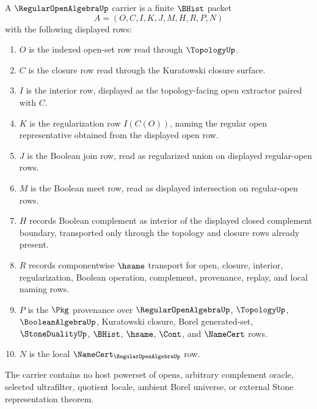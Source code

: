 \begin{definition}
\label{def:regular-open-algebra-carrier}
A $\RegularOpenAlgebraUp$ carrier is a finite $\BHist$ packet
$$
A=(O,C,I,K,J,M,H,R,P,N)
$$
with the following displayed rows:
\begin{enumerate}
\item $O$ is the indexed open-set row read through $\TopologyUp$.
\item $C$ is the closure row read through the Kuratowski closure surface.
\item $I$ is the interior row, displayed as the topology-facing open extractor paired with $C$.
\item $K$ is the regularization row $I(C(O))$, naming the regular open representative obtained from the displayed open row.
\item $J$ is the Boolean join row, read as regularized union on displayed regular-open rows.
\item $M$ is the Boolean meet row, read as displayed intersection on regular-open rows.
\item $H$ records Boolean complement as interior of the displayed closed complement boundary, transported only through the topology and closure rows already present.
\item $R$ records componentwise $\hsame$ transport for open, closure, interior, regularization, Boolean operation, complement, provenance, replay, and local naming rows.
\item $P$ is the $\Pkg$ provenance over $\RegularOpenAlgebraUp$, $\TopologyUp$, $\BooleanAlgebraUp$, Kuratowski closure, Borel generated-set, $\StoneDualityUp$, $\BHist$, $\hsame$, $\Cont$, and $\NameCert$ rows.
\item $N$ is the local $\NameCert_{\RegularOpenAlgebraUp}$ row.
\end{enumerate}
The carrier contains no host powerset of opens, arbitrary complement oracle, selected ultrafilter, quotient locale, ambient Borel universe, or external Stone representation theorem.
\end{definition}

